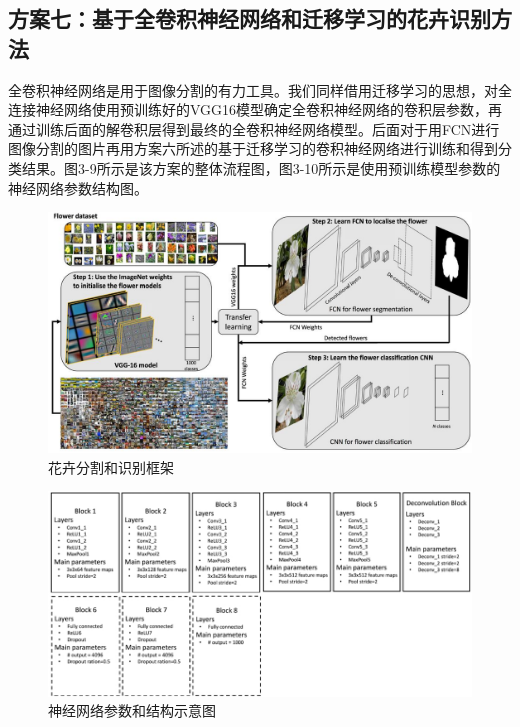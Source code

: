\documentclass[supercite]{HustGraduPaper}
\begin{document}
\begin{sloppypar}
  \subsection{方案七：基于全卷积神经网络和迁移学习的花卉识别方法}
  全卷积神经网络是用于图像分割的有力工具。我们同样借用迁移学习的思想，对全连接神经网络使用预训练好的VGG16模型确定全卷积神经网络的卷积层参数，再通过训练后面的解卷积层得到最终的全卷积神经网络模型。后面对于用FCN进行图像分割的图片再用方案六所述的基于迁移学习的卷积神经网络进行训练和得到分类结果。图3-9所示是该方案的整体流程图，图3-10所示是使用预训练模型参数的神经网络参数结构图。\begin{figure}[H]
    \setlength{\abovecaptionskip}{0.2cm}
    \setlength{\belowcaptionskip}{-0.cm}
      \centering%
      \includegraphics[scale=0.45]{27.jpg}
      \caption{花卉分割和识别框架}
    \end{figure}\begin{figure}[H]
      \setlength{\abovecaptionskip}{0.2cm}
      \setlength{\belowcaptionskip}{-0.cm}
        \centering%
        \includegraphics[scale=0.7]{28.jpg}
        \caption{神经网络参数和结构示意图}
    \end{figure}


\end{sloppypar}
\end{document}
